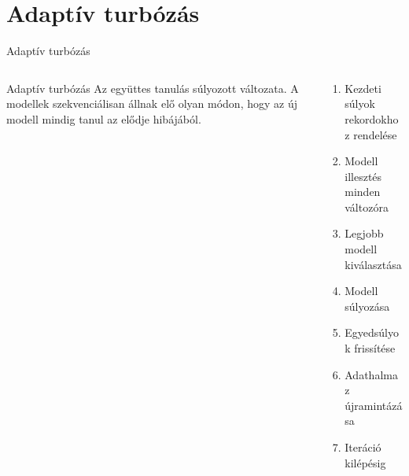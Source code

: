 \documentclass[english, aspectratio=169]{beamer}
\makeatletter
\let\origtableofcontents=\tableofcontents
\def\tableofcontents{\@ifnextchar[{\origtableofcontents}{\gobbletableofcontents}}
\def\gobbletableofcontents#1{\origtableofcontents}
\makeatother
\begin{document}
\section{Adaptív turbózás}

\begin{frame}
\tableofcontents[currentsection]
\end{frame}

\begin{frame}{Adaptív turbózás}
\begin{columns}
\begin{column}{.5\textwidth}
\begin{block}{Adaptív turbózás}
Az együttes tanulás súlyozott változata. A modellek szekvenciálisan állnak elő olyan módon, hogy az új modell mindig tanul az elődje hibájából. 
\end{block}
\end{column}
\begin{column}{.5\textwidth}
\begin{algorithm}[H]
\caption{Adaptív turbózás}
\SetAlgoLined
\begin{enumerate}
	\item Kezdeti súlyok rekordokhoz rendelése
	\item Modell illesztés minden változóra
	\item Legjobb modell kiválasztása
	\item Modell súlyozása
	\item Egyedsúlyok frissítése
	\item Adathalmaz újramintázása
	\item Iteráció kilépésig
\end{enumerate}
\end{algorithm}
\end{column}
\end{columns}
\end{frame}
\end{document}
